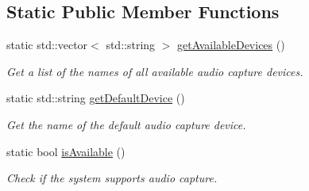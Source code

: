 \subsection*{Static Public Member Functions}
\begin{DoxyCompactItemize}
\item 
static std\+::vector$<$ std\+::string $>$ \hyperlink{classsf_1_1_sound_recorder_a26198c5c11efcd61f426f326fe314afe}{get\+Available\+Devices} ()
\begin{DoxyCompactList}\small\item\em Get a list of the names of all available audio capture devices. \end{DoxyCompactList}\item 
static std\+::string \hyperlink{classsf_1_1_sound_recorder_ad1d450a80642dab4b632999d72a1bf23}{get\+Default\+Device} ()
\begin{DoxyCompactList}\small\item\em Get the name of the default audio capture device. \end{DoxyCompactList}\item 
static bool \hyperlink{classsf_1_1_sound_recorder_aab2bd0fee9e48d6cfd449b1cb078ce5a}{is\+Available} ()
\begin{DoxyCompactList}\small\item\em Check if the system supports audio capture. \end{DoxyCompactList}\end{DoxyCompactItemize}
